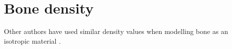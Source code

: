 \section{Bone density}
Other authors have used similar density values when modelling bone as an isotropic material \cite{shaikh_modal_2020}.

\section{}
